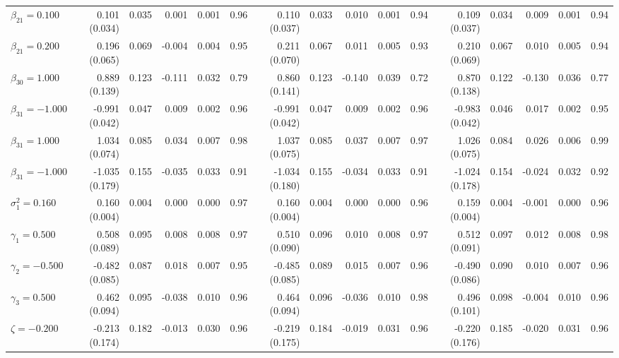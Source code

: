 \begin{landscape}
\begin{table}[ht]
\begin{tabular}{l|rrrrr:rrrrr:rrrrr}
  $\beta_{21}= 0.100$ &  0.101 (0.034) & 0.035 &  0.001 & 0.001 & 0.96 &  0.110 (0.037) & 0.033 &  0.010 & 0.001 & 0.94 &  0.109 (0.037) & 0.034 &  0.009 & 0.001 & 0.94 \\ 
  $\beta_{21}= 0.200$ &  0.196 (0.065) & 0.069 & -0.004 & 0.004 & 0.95 &  0.211 (0.070) & 0.067 &  0.011 & 0.005 & 0.93 &  0.210 (0.069) & 0.067 &  0.010 & 0.005 & 0.94 \\ 
  $\beta_{30}= 1.000$ &  0.889 (0.139) & 0.123 & -0.111 & 0.032 & 0.79 &  0.860 (0.141) & 0.123 & -0.140 & 0.039 & 0.72 &  0.870 (0.138) & 0.122 & -0.130 & 0.036 & 0.77 \\ 
  $\beta_{31}=-1.000$ & -0.991 (0.042) & 0.047 &  0.009 & 0.002 & 0.96 & -0.991 (0.042) & 0.047 &  0.009 & 0.002 & 0.96 & -0.983 (0.042) & 0.046 &  0.017 & 0.002 & 0.95 \\ 
  $\beta_{31}= 1.000$ &  1.034 (0.074) & 0.085 &  0.034 & 0.007 & 0.98 &  1.037 (0.075) & 0.085 &  0.037 & 0.007 & 0.97 &  1.026 (0.075) & 0.084 &  0.026 & 0.006 & 0.99 \\ 
  $\beta_{31}=-1.000$ & -1.035 (0.179) & 0.155 & -0.035 & 0.033 & 0.91 & -1.034 (0.180) & 0.155 & -0.034 & 0.033 & 0.91 & -1.024 (0.178) & 0.154 & -0.024 & 0.032 & 0.92 \\ 
  $\sigma^2_1= 0.160$ &  0.160 (0.004) & 0.004 &  0.000 & 0.000 & 0.97 &  0.160 (0.004) & 0.004 &  0.000 & 0.000 & 0.96 &  0.159 (0.004) & 0.004 & -0.001 & 0.000 & 0.96 \\ 
  $\gamma_1= 0.500$ &  0.508 (0.089) & 0.095 &  0.008 & 0.008 & 0.97 &  0.510 (0.090) & 0.096 &  0.010 & 0.008 & 0.97 &  0.512 (0.091) & 0.097 &  0.012 & 0.008 & 0.98 \\ 
  $\gamma_2=-0.500$ & -0.482 (0.085) & 0.087 &  0.018 & 0.007 & 0.95 & -0.485 (0.085) & 0.089 &  0.015 & 0.007 & 0.96 & -0.490 (0.086) & 0.090 &  0.010 & 0.007 & 0.96 \\ 
  $\gamma_3= 0.500$ &  0.462 (0.094) & 0.095 & -0.038 & 0.010 & 0.96 &  0.464 (0.094) & 0.096 & -0.036 & 0.010 & 0.98 &  0.496 (0.101) & 0.098 & -0.004 & 0.010 & 0.96 \\ 
  $\zeta=-0.200$ & -0.213 (0.174) & 0.182 & -0.013 & 0.030 & 0.96 & -0.219 (0.175) & 0.184 & -0.019 & 0.031 & 0.96 & -0.220 (0.176) & 0.185 & -0.020 & 0.031 & 0.96 \\ 
   \hline
\end{tabular}
\endgroup

\end{table}
\end{landscape}
